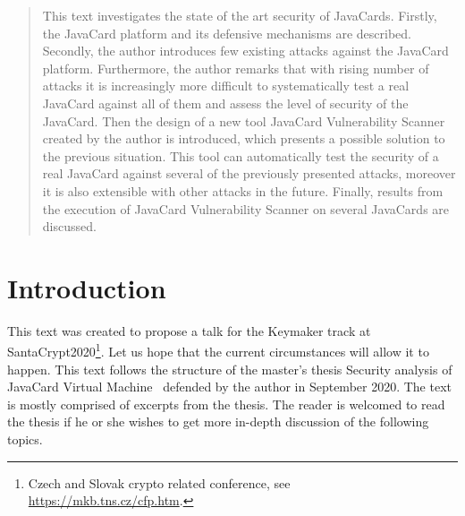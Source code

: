 \documentclass{../llncs/llncs}
\begin{document}
\maketitle

\begin{abstract}
This text investigates the state of the art security of JavaCards. Firstly, the JavaCard platform and its defensive mechanisms are described. Secondly, the author introduces few existing attacks against the JavaCard platform. Furthermore, the author remarks that with rising number of attacks it is increasingly more difficult to systematically test a real JavaCard against all of them and assess the level of security of the JavaCard. Then the design of a new tool JavaCard Vulnerability Scanner created by the author is introduced, which presents a possible solution to the previous situation. This tool can automatically test the security of a real JavaCard against several of the previously presented attacks, moreover it is also extensible with other attacks in the future. Finally, results from the execution of JavaCard Vulnerability Scanner on several JavaCards are discussed.
\end{abstract}



\section{Introduction}

This text was created to propose a talk for the Keymaker track at SantaCrypt2020\footnote{Czech and Slovak crypto related conference, see \url{https://mkb.tns.cz/cfp.htm}.}. Let us hope that the current circumstances will allow it to happen. This text follows the structure of the master's thesis Security analysis of JavaCard Virtual Machine~\cite{anon2020thesis} defended by the author in September 2020. The text is mostly comprised of excerpts from the thesis. The reader is welcomed to read the thesis if he or she wishes to get more in-depth discussion of the following topics.
\end{document}
